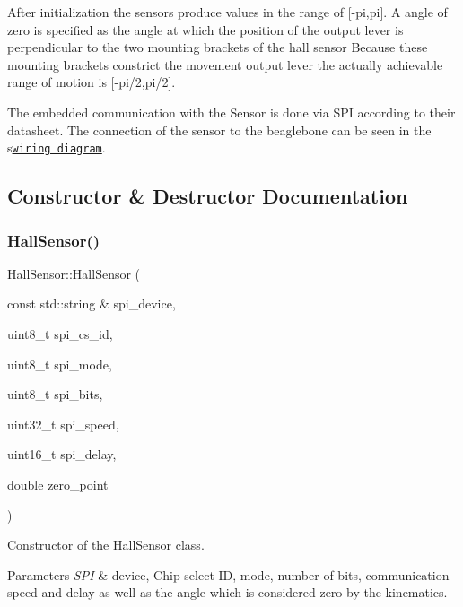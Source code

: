 After initialization the sensors produce values in the range of \mbox{[}-\/pi,pi\mbox{]}. A angle of zero is specified as the angle at which the position of the output lever is perpendicular to the two mounting brackets of the hall sensor Because these mounting brackets constrict the movement output lever the actually achievable range of motion is \mbox{[}-\/pi/2,pi/2\mbox{]}.

The embedded communication with the Sensor is done via S\+PI according to their datasheet. The connection of the sensor to the beaglebone can be seen in the s\href{https://github.com/TriPed-Robot/Wiki/wiki/Wiring-diagram}{\tt wiring diagram}. 

\subsection{Constructor \& Destructor Documentation}
\mbox{\label{classHallSensor_ac901b856eff0dffb4dfa5fdeaf888c4c}} 
\subsubsection{\texorpdfstring{Hall\+Sensor()}{HallSensor()}}
{\footnotesize\ttfamily Hall\+Sensor\+::\+Hall\+Sensor (\begin{DoxyParamCaption}\item[{const std\+::string \&}]{spi\+\_\+device,  }\item[{uint8\+\_\+t}]{spi\+\_\+cs\+\_\+id,  }\item[{uint8\+\_\+t}]{spi\+\_\+mode,  }\item[{uint8\+\_\+t}]{spi\+\_\+bits,  }\item[{uint32\+\_\+t}]{spi\+\_\+speed,  }\item[{uint16\+\_\+t}]{spi\+\_\+delay,  }\item[{double}]{zero\+\_\+point }\end{DoxyParamCaption})}



Constructor of the \hyperlink{classHallSensor}{Hall\+Sensor} class. 


\begin{DoxyParams}{Parameters}
{\em S\+PI} & device, Chip select ID, mode, number of bits, communication speed and delay as well as the angle which is considered zero by the kinematics. \\
\hline
\end{DoxyParams}


